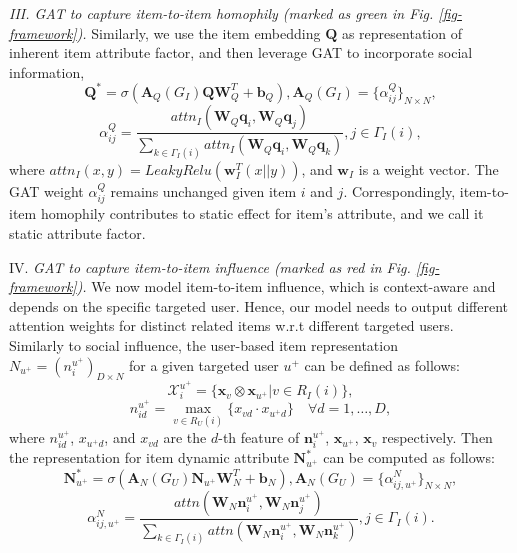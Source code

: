 \documentclass[sigconf]{acmart}
\begin{document}
\emph{III. GAT to capture item-to-item homophily (marked as green in Fig. \ref{fig-framework}).} Similarly, we use the item embedding $\mathbf Q$ as representation of inherent item attribute factor, and then leverage GAT to incorporate social information,
\begin{equation}\nonumber
\mathbf Q^* = \sigma(\mathbf A_Q(G_I)\mathbf Q\mathbf W_Q^T+\mathbf b_Q), \mathbf A_Q(G_I) = \{\alpha^Q_{ij}\}_{N\times N},
\end{equation}
\begin{equation}\nonumber
\alpha^Q_{ij} = \frac{ attn_I(\mathbf W_Q \mathbf q_i, \mathbf W_Q \mathbf q_j)}{\sum_{k\in  \Gamma_I(i)}attn_I(\mathbf W_Q \mathbf q_i, \mathbf W_Q \mathbf q_k)}, j\in \Gamma_I(i),
\end{equation}
where $attn_I(x,y) = LeakyRelu(\mathbf w_I^T(x||y))$, and $\mathbf w_I$ is a weight vector. The GAT weight $\alpha^Q_{ij}$ remains unchanged given item $i$ and $j$. Correspondingly, item-to-item homophily contributes to static effect for item's attribute, and we call it static attribute factor.

IV. \emph{GAT to capture item-to-item influence (marked as red in Fig. \ref{fig-framework}).} We now model item-to-item influence, which is context-aware and {depends on the} specific targeted user. Hence, our model needs to output different attention weights for distinct related items w.r.t different targeted users. 
{Similarly to social influence, the user-based item representation $N_{u^+} = (n^{u^+}_i)_{D\times N}$ for a given targeted user $u^+$  can be defined as follows: 
\begin{equation}\nonumber
\mathcal X^{u^+}_i = \{\mathbf x_v \otimes \mathbf x_{u^+}|v\in R_I(i)\},
\end{equation}
\begin{equation}\nonumber
n^{u^+}_{id} = \max\limits_{v\in R_U(i)} \{x_{vd}\cdot x_{{u^+}d}\}\quad \forall d=1, \ldots, D,
\end{equation}
where $n^{u^+}_{id}$, $x_{{u^+}d}$, {and} $x_{vd}$ are the $d$-th feature of $\mathbf n^{u^+}_i$, $\mathbf x_{u^+}$, $\mathbf x_v$ respectively.
Then} the representation for item dynamic attribute $\mathbf N_{u^+}^*$ can be computed as follows:
\begin{equation}\nonumber
\mathbf N_{u^+}^* = \sigma(\mathbf A_N(G_U)\mathbf N_{u^+}\mathbf W_N^T+\mathbf b_N),\mathbf A_N(G_U) = \{\alpha^N_{ij,{u^+}}\}_{N\times N},
\end{equation}
\begin{equation}\nonumber
\alpha^N_{ij,{u^+}} = \frac{ attn(\mathbf W_N \mathbf n^{u^+}_i, \mathbf W_N \mathbf n^{u^+}_j)}{\sum_{k\in  \Gamma_I(i)}attn(\mathbf W_N \mathbf n^{u^+}_i, \mathbf W_N \mathbf n^{u^+}_k)}, j\in \Gamma_I(i).
\end{equation}
\end{document}
